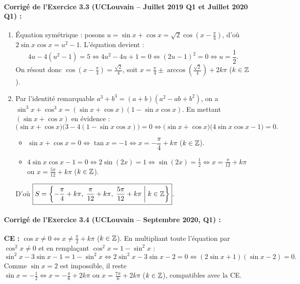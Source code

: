 \paragraph{Corrigé de l'Exercice 3.3 (UCLouvain -- Juillet 2019 Q1 et Juillet 2020 Q1) :}
\begin{enumerate}[label=(\alph*)]
    \item Équation symétrique : posons $u = \sin x + \cos x = \sqrt{2}\cos\left(x - \frac{\pi}{4}\right)$, d'où $2\sin x\cos x = u^2 - 1$. L'équation devient :
    \[
        4u - 4(u^2 - 1) = 5 \iff 4u^2 - 4u + 1 = 0 \iff (2u - 1)^2 = 0 \iff u = \frac{1}{2}.
    \]
    On résout donc $\cos\left(x - \frac{\pi}{4}\right) = \frac{\sqrt{2}}{4}$, soit $\boxed{x = \frac{\pi}{4} \pm \arccos\left(\frac{\sqrt{2}}{4}\right) + 2k\pi}$ ($k\in\mathbb{Z}$).
    \item Par l'identité remarquable $a^3 + b^3 = (a+b)(a^2 - ab + b^2)$, on a $\sin^3 x + \cos^3 x = (\sin x + \cos x)(1 - \sin x\cos x)$. En mettant $(\sin x + \cos x)$ en évidence :
    \[
        \bigl(\sin x + \cos x\bigr)\bigl(3 - 4(1 - \sin x\cos x)\bigr) = 0 \iff \bigl(\sin x + \cos x\bigr)\bigl(4\sin x\cos x - 1\bigr) = 0.
    \]
    \begin{itemize}
        \item $\sin x + \cos x = 0 \iff \tan x = -1 \iff x = -\dfrac{\pi}{4} + k\pi$ ($k\in\mathbb{Z}$).
        \item $4\sin x\cos x - 1 = 0 \iff 2\sin(2x) = 1 \iff \sin(2x) = \frac{1}{2} \iff x = \frac{\pi}{12} + k\pi$ ou $x = \frac{5\pi}{12} + k\pi$ ($k\in\mathbb{Z}$).
    \end{itemize}
    D'où $\boxed{S = \left\{-\frac{\pi}{4} + k\pi,\; \frac{\pi}{12} + k\pi,\; \frac{5\pi}{12} + k\pi \;\middle|\; k\in\mathbb{Z}\right\}}$.
\end{enumerate}

\paragraph{Corrigé de l'Exercice 3.4 (UCLouvain -- Septembre 2020, Q1) :}
\textbf{CE :} $\cos x \neq 0 \iff x \neq \frac{\pi}{2} + k\pi$ ($k\in\mathbb{Z}$). En multipliant toute l'équation par $\cos^2 x \neq 0$ et en remplaçant $\cos^2 x = 1 - \sin^2 x$ :
\[
    \sin^2 x - 3\sin x - 1 = 1 - \sin^2 x \iff 2\sin^2 x - 3\sin x - 2 = 0 \iff (2\sin x + 1)(\sin x - 2) = 0.
\]
Comme $\sin x = 2$ est impossible, il reste $\sin x = -\frac{1}{2} \iff \boxed{x = -\frac{\pi}{6} + 2k\pi \text{ ou } x = \frac{7\pi}{6} + 2k\pi}$ ($k\in\mathbb{Z}$), compatibles avec la CE.


